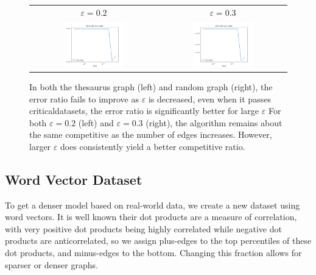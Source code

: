 \documentclass[
]{article}
\begin{document}
\begin{figure}[!htb]
  \begin{tabular}{cc}
    {\(\varepsilon  = 0.2\)} & {\(\varepsilon = 0.3\)}\\
    \includegraphics[width=0.5\textwidth]{images/error_ratio_as_eps_varies_loglog_thesaurus.png}
    &
    \includegraphics[width=0.5\textwidth]{images/error_ratio_as_eps_varies_loglog.png}\\
  \end{tabular}
  \caption{\label{fig:error-ratio-small-eps}
  In both the thesaurus graph (left) and random graph (right), the error
  ratio fails to improve as $\varepsilon$ is decreased, even when it passes
  criticaldatasets, the error ratio is significantly better for large $\varepsilon$
  For both $\varepsilon = 0.2$ (left) and $\varepsilon = 0.3$ (right), the
  algorithm remains about the same competitive as the number of edges
  increases. However, larger $\varepsilon$ does consistently yield
  a better competitive ratio.}
\end{figure}

\hypertarget{word-vector-dataset}{%
  \subsection{Word Vector Dataset}\label{word-vector-dataset}}


To get a denser model based on real-world data, we create a new dataset
using word vectors. It is well known their dot products are a measure of
correlation, with very positive dot products being highly correlated
while negative dot products are anticorrelated, so we assign plus-edges
to the top percentiles of these dot products, and minus-edges to the
bottom. Changing this fraction allows for sparser or denser graphs.
\end{document}
